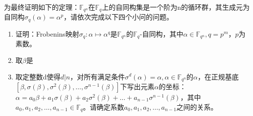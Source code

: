 为最终证明如下的定理：$\mathbb{F}_{q^n}$在$\mathbb{F}_{q}$上的自同构集是一个阶为n的循环群，其生成元为自同构$\sigma_q(\alpha)=\alpha^p$，请依次完成以下四个小问的问题。
\begin{enumerate}
    \item 证明：Frobenins映射$\sigma_q:\alpha\mapsto\alpha^q$是$\mathbb{F}_{q^n}$的$\mathbb{F}_{q}$-自同构，其中$\alpha\in\mathbb{F}_{q^n}, q=p^m$，$p$为素数。
    

    \item 取$\beta$是

    \item 取定整数d使得$d|n$，对所有满足条件$\sigma^d(\alpha)=\alpha, \alpha\in\mathbb{F}_{q^n}$的$\alpha$，在正规基底$[\beta,\sigma(\beta),\sigma^2(\beta),\dots,\sigma^{n-1}(\beta)]$下写出元素$\alpha$的坐标：$\alpha=a_0\beta+a_1\sigma(\beta)+a_2\sigma^2(\beta)+\dots+a_{n-1}\sigma^{n-1}(\beta)$，其中$a_0,a_1,a_2,\dots,a_{n-1}\in\mathbb{F}_{q}$。请确定系数$a_0,a_1,a_2,\dots,a_{n-1}$之间的关系。
    
\end{enumerate}